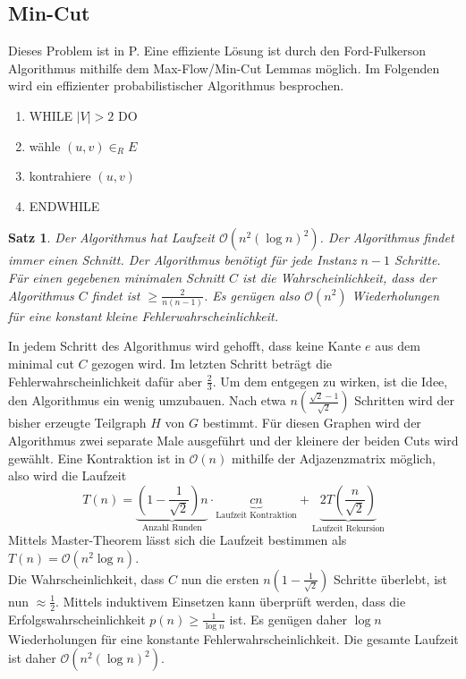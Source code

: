 \documentclass[a4paper, 12pt]{article}
\theoremstyle{plain}
\newtheorem{theorem}{Satz}[section] %
\theoremstyle{definition}
\theoremstyle{lemma}
\theoremstyle{remark}
\theoremstyle{corollary}
\theoremstyle{example}
\begin{document}
	\subsection{Min-Cut}
	Dieses Problem ist in P. Eine effiziente Lösung ist durch den Ford-Fulkerson Algorithmus mithilfe dem Max-Flow/Min-Cut Lemmas möglich. Im Folgenden wird ein effizienter probabilistischer Algorithmus besprochen.
	\begin{enumerate}
		\item WHILE $\left|V\right| > 2$ DO
		\item wähle $(u,v) \in_R E$
		\item kontrahiere $(u,v)$
		\item ENDWHILE
	\end{enumerate}
	\begin{theorem}
		Der Algorithmus hat Laufzeit $\mathcal{O}(n^2 (\log n)^2)$. Der Algorithmus findet immer einen Schnitt. Der Algorithmus benötigt für jede Instanz $n-1$ Schritte. Für einen gegebenen minimalen Schnitt $C$ ist die Wahrscheinlichkeit, dass der Algorithmus $C$ findet ist $\geq \frac{2}{n(n-1)}$. Es genügen also $\mathcal{O}(n^2)$ Wiederholungen für eine konstant kleine Fehlerwahrscheinlichkeit.
	\end{theorem}
	In jedem Schritt des Algorithmus wird gehofft, dass keine Kante $e$ aus dem minimal cut $C$ gezogen wird. Im letzten Schritt beträgt die Fehlerwahrscheinlichkeit dafür aber $\frac{2}{3}$. Um dem entgegen zu wirken, ist die Idee, den Algorithmus ein wenig umzubauen. Nach etwa $n\left(\frac{\sqrt{2} - 1}{\sqrt{2}}\right)$ Schritten wird der bisher erzeugte Teilgraph $H$ von $G$ bestimmt. Für diesen Graphen wird der Algorithmus zwei separate Male ausgeführt und der kleinere der beiden Cuts wird gewählt. Eine Kontraktion ist in $\mathcal{O}(n)$ mithilfe der Adjazenzmatrix möglich, also wird die Laufzeit \[T(n) = \underbrace{\left(1-\frac{1}{\sqrt{2}}\right)n}_{\text{Anzahl Runden}} \cdot \underbrace{cn}_{\text{Laufzeit Kontraktion}} + \underbrace{2T\left(\frac{n}{\sqrt{2}}\right)}_{\text{Laufzeit Rekursion}}\]
	Mittels Master-Theorem lässt sich die Laufzeit bestimmen als $T(n) = \mathcal{O}(n^2 \log n)$.\\
	Die Wahrscheinlichkeit, dass $C$ nun die ersten $n\left(1-\frac{1}{\sqrt{2}}\right)$ Schritte überlebt, ist nun $\approx \frac{1}{2}$. Mittels induktivem Einsetzen kann überprüft werden, dass die Erfolgswahrscheinlichkeit $p(n) \geq \frac{1}{\log n}$ ist. Es genügen daher $\log n$ Wiederholungen für eine konstante Fehlerwahrscheinlichkeit. Die gesamte Laufzeit ist daher $\mathcal{O}(n^2 (\log n)^2)$.
\end{document}
